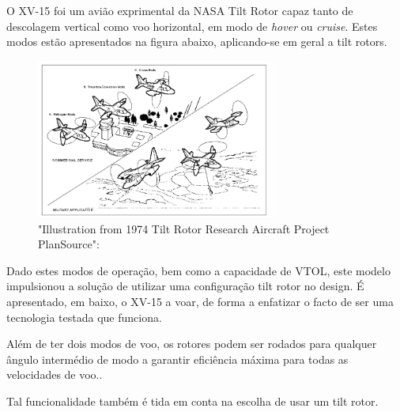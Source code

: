 O XV-15 foi um avião exprimental da NASA Tilt Rotor capaz tanto de descolagem vertical como voo horizontal, em modo de \textit{hover} ou \textit{cruise}.\cite{Maisel2001-fz} Estes modos estão apresentados na figura abaixo, aplicando-se em geral a tilt rotors.
\FloatBarrier
\begin{figure}[h]
    \centering
    \includegraphics[width=0.7\textwidth]{Imagens/tiltrotor.PNG}
    \caption{"Illustration from 1974 Tilt Rotor Research Aircraft Project PlanSource":\cite{Maisel2001-fz}}
    \label{fig:my_label}
\end{figure}
\FloatBarrier
Dado estes modos de operação, bem como a capacidade de VTOL, este modelo impulsionou a solução de utilizar uma configuração tilt rotor no design. É apresentado, em baixo, o XV-15 a voar, de forma a enfatizar o facto de ser uma tecnologia testada que funciona. 

Além de ter dois modos de voo, os rotores podem ser rodados para qualquer ângulo intermédio de modo a garantir eficiência máxima para todas as velocidades de voo.\cite{Maisel2001-fz}. 

Tal funcionalidade também é tida em conta na escolha de usar um tilt rotor.\par 


